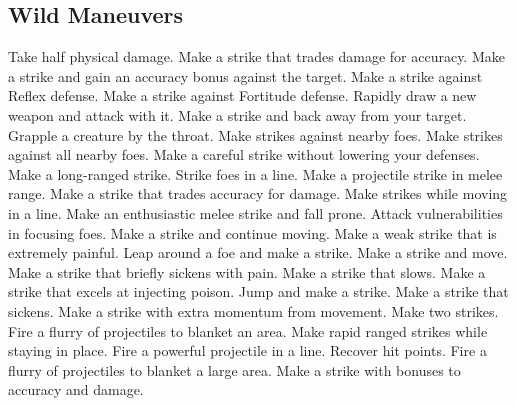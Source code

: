 \subsection{Wild Maneuvers}\label{Wild Maneuvers}
\begin{spelllist}
 Take half physical damage.
 Make a strike that trades damage for accuracy.
 Make a strike and gain an accuracy bonus against the target.
 Make a strike against Reflex defense.
 Make a strike against Fortitude defense.
 Rapidly draw a new weapon and attack with it.
 Make a strike and back away from your target.
 Grapple a creature by the throat.
 Make strikes against nearby foes.
 Make strikes against all nearby foes.
 Make a careful strike without lowering your defenses.
 Make a long-ranged strike.
 Strike foes in a line.
 Make a projectile strike in melee range.
 Make a strike that trades accuracy for damage.
 Make strikes while moving in a line.
 Make an enthusiastic melee strike and fall prone.
 Attack vulnerabilities in focusing foes.
 Make a strike and continue moving.
 Make a weak strike that is extremely painful.
 Leap around a foe and make a strike.
 Make a strike and move.
 Make a strike that briefly sickens with pain.
 Make a strike that slows.
 Make a strike that excels at injecting poison.
 Jump and make a strike.
 Make a strike that sickens.
 Make a strike with extra momentum from movement.
 Make two strikes.
 Fire a flurry of projectiles to blanket an area.
 Make rapid ranged strikes while staying in place.
 Fire a powerful projectile in a line.
 Recover hit points.
 Fire a flurry of projectiles to blanket a large area.
 Make a strike with bonuses to accuracy and damage.
\end{spelllist}
